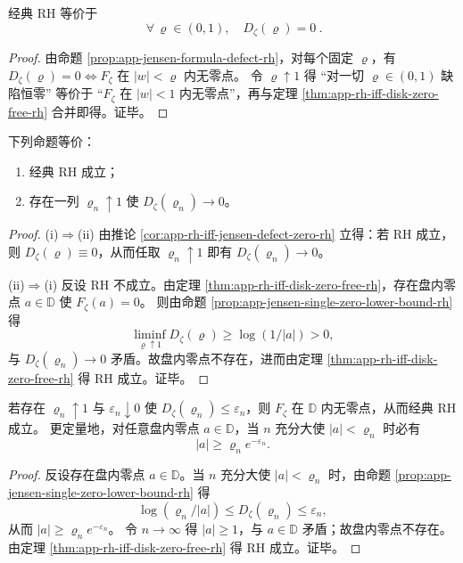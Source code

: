 \begin{corollary}\label{cor:app-rh-iff-jensen-defect-zero-rh}
经典 RH 等价于
$$
\boxed{\ \forall\,\varrho\in(0,1),\quad D_\zeta(\varrho)=0\ }.
$$
\end{corollary}
\begin{proof}
由命题 \ref{prop:app-jensen-formula-defect-rh}，对每个固定 \(\varrho\)，有 \(D_\zeta(\varrho)=0\iff F_\zeta\) 在 \(|w|<\varrho\) 内无零点。
令 \(\varrho\uparrow 1\) 得 “对一切 \(\varrho\in(0,1)\) 缺陷恒零” 等价于 “\(F_\zeta\) 在 \(|w|<1\) 内无零点”，再与定理 \ref{thm:app-rh-iff-disk-zero-free-rh} 合并即得。证毕。
\end{proof}

\begin{theorem}[趋近边界的缺陷趋零判据]\label{thm:app-rh-iff-jensen-defect-vanishing-sequence-rh}
下列命题等价：
\begin{enumerate}
  \item[(i)] 经典 RH 成立；
  \item[(ii)] 存在一列 \(\varrho_n\uparrow 1\) 使 \(D_\zeta(\varrho_n)\to 0\)。
\end{enumerate}
\end{theorem}
\begin{proof}
(i)\(\Rightarrow\)(ii) 由推论 \ref{cor:app-rh-iff-jensen-defect-zero-rh} 立得：若 RH 成立，则 \(D_\zeta(\varrho)\equiv 0\)，从而任取 \(\varrho_n\uparrow 1\) 即有 \(D_\zeta(\varrho_n)\to 0\)。
\par
(ii)\(\Rightarrow\)(i) 反设 RH 不成立。由定理 \ref{thm:app-rh-iff-disk-zero-free-rh}，存在盘内零点 \(a\in\mathbb{D}\) 使 \(F_\zeta(a)=0\)。
则由命题 \ref{prop:app-jensen-single-zero-lower-bound-rh} 得
$$
\liminf_{\varrho\uparrow 1}D_\zeta(\varrho)\ge \log(1/|a|)>0,
$$
与 \(D_\zeta(\varrho_n)\to 0\) 矛盾。故盘内零点不存在，进而由定理 \ref{thm:app-rh-iff-disk-zero-free-rh} 得 RH 成立。证毕。
\end{proof}

\begin{corollary}[缺陷上界序列给出的零点排除证书]\label{cor:app-jensen-defect-upperbound-certificate-rh}
若存在 \(\varrho_n\uparrow 1\) 与 \(\varepsilon_n\downarrow 0\) 使 \(D_\zeta(\varrho_n)\le \varepsilon_n\)，则 \(F_\zeta\) 在 \(\mathbb{D}\) 内无零点，从而经典 RH 成立。
更定量地，对任意盘内零点 \(a\in\mathbb{D}\)，当 \(n\) 充分大使 \(|a|<\varrho_n\) 时必有
$$
|a|\ge \varrho_n e^{-\varepsilon_n}.
$$
\end{corollary}
\begin{proof}
反设存在盘内零点 \(a\in\mathbb{D}\)。当 \(n\) 充分大使 \(|a|<\varrho_n\) 时，由命题 \ref{prop:app-jensen-single-zero-lower-bound-rh} 得
$$
\log(\varrho_n/|a|)\le D_\zeta(\varrho_n)\le \varepsilon_n,
$$
从而 \(|a|\ge \varrho_n e^{-\varepsilon_n}\)。
令 \(n\to\infty\) 得 \(|a|\ge 1\)，与 \(a\in\mathbb{D}\) 矛盾；故盘内零点不存在。由定理 \ref{thm:app-rh-iff-disk-zero-free-rh} 得 RH 成立。证毕。
\end{proof}

